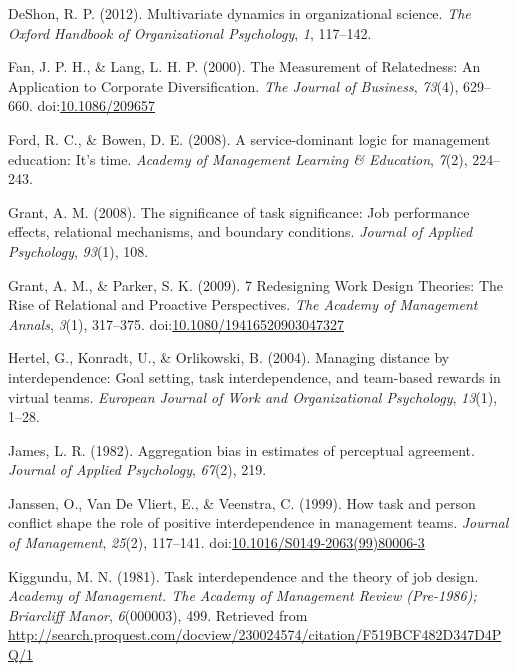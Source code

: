 \documentclass[english,,man]{apa6}
\theoremstyle{definition}
\theoremstyle{definition}
\theoremstyle{definition}
\theoremstyle{remark}
\begin{document}
\leavevmode\hypertarget{ref-deshon_multivariate_2012}{}%
DeShon, R. P. (2012). Multivariate dynamics in organizational science.
\emph{The Oxford Handbook of Organizational Psychology}, \emph{1},
117--142.

\leavevmode\hypertarget{ref-fan_measurement_2000}{}%
Fan, J. P. H., \& Lang, L. H. P. (2000). The Measurement of Relatedness:
An Application to Corporate Diversification. \emph{The Journal of
Business}, \emph{73}(4), 629--660.
doi:\href{https://doi.org/10.1086/209657}{10.1086/209657}

\leavevmode\hypertarget{ref-ford_service-dominant_2008}{}%
Ford, R. C., \& Bowen, D. E. (2008). A service-dominant logic for
management education: It's time. \emph{Academy of Management Learning \&
Education}, \emph{7}(2), 224--243.

\leavevmode\hypertarget{ref-grant_significance_2008}{}%
Grant, A. M. (2008). The significance of task significance: Job
performance effects, relational mechanisms, and boundary conditions.
\emph{Journal of Applied Psychology}, \emph{93}(1), 108.

\leavevmode\hypertarget{ref-grant_7_2009}{}%
Grant, A. M., \& Parker, S. K. (2009). 7 Redesigning Work Design
Theories: The Rise of Relational and Proactive Perspectives. \emph{The
Academy of Management Annals}, \emph{3}(1), 317--375.
doi:\href{https://doi.org/10.1080/19416520903047327}{10.1080/19416520903047327}

\leavevmode\hypertarget{ref-hertel_managing_2004}{}%
Hertel, G., Konradt, U., \& Orlikowski, B. (2004). Managing distance by
interdependence: Goal setting, task interdependence, and team-based
rewards in virtual teams. \emph{European Journal of Work and
Organizational Psychology}, \emph{13}(1), 1--28.

\leavevmode\hypertarget{ref-james_aggregation_1982}{}%
James, L. R. (1982). Aggregation bias in estimates of perceptual
agreement. \emph{Journal of Applied Psychology}, \emph{67}(2), 219.

\leavevmode\hypertarget{ref-janssen_how_1999}{}%
Janssen, O., Van De Vliert, E., \& Veenstra, C. (1999). How task and
person conflict shape the role of positive interdependence in management
teams. \emph{Journal of Management}, \emph{25}(2), 117--141.
doi:\href{https://doi.org/10.1016/S0149-2063(99)80006-3}{10.1016/S0149-2063(99)80006-3}

\leavevmode\hypertarget{ref-kiggundu_task_1981}{}%
Kiggundu, M. N. (1981). Task interdependence and the theory of job
design. \emph{Academy of Management. The Academy of Management Review
(Pre-1986); Briarcliff Manor}, \emph{6}(000003), 499. Retrieved from
\url{http://search.proquest.com/docview/230024574/citation/F519BCF482D347D4PQ/1}
\end{document}
